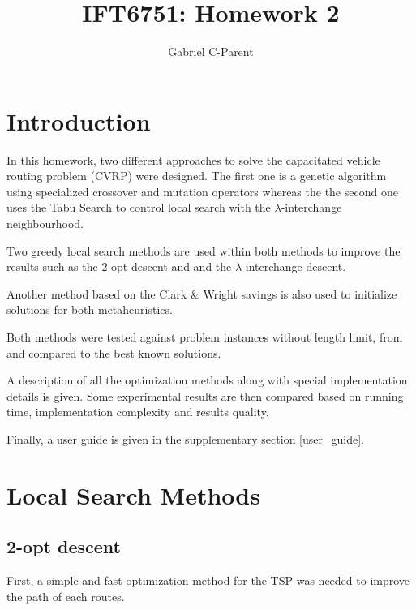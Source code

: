\documentclass{article} %
\author{
Gabriel C-Parent\\
}
\begin{document}
\title{IFT6751: Homework 2}
      
\maketitle
\section{Introduction}

In this homework, two different approaches to solve the capacitated vehicle routing problem (CVRP) were designed. The first one is a genetic algorithm using specialized crossover and mutation operators whereas the the second one uses the Tabu Search to control local search with the $\lambda$-interchange neighbourhood.\newline

Two greedy local search methods are used within both methods to improve the results such as the 2-opt descent and  and the $\lambda$-interchange descent.\newline

Another method based on the Clark \& Wright savings is also used to initialize solutions for both metaheuristics.\newline


Both methods were tested against problem instances without length limit, from \citep{christofides} and compared to the best known solutions.\newline


A description of all the optimization methods along with special implementation details is given.
Some experimental results are then compared based on running time, implementation complexity and results quality.\newline

Finally, a user guide is given in the supplementary section \ref{user_guide}.



\newpage
\section{Local Search Methods}
\label{local_search}


\subsection{2-opt descent}
\label{local_tsp}

First, a simple and fast optimization method for the TSP was needed to improve the path of each routes.
\end{document}
